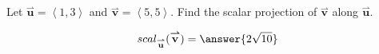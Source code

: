 \documentclass{ximera}
\author{Gregory Hartman \and Matthew Carr \and Bart Snapp}
\begin{document}
\begin{exercise}
Let $\overset{\boldsymbol{\rightharpoonup}}{\mathbf{u}} = \left< 1,3 \right>$ and $\overset{\boldsymbol{\rightharpoonup}}{\mathbf{v}} = \left< 5,5 \right>$. Find the
scalar projection of $\overset{\boldsymbol{\rightharpoonup}}{\mathbf{v}}$ along $\overset{\boldsymbol{\rightharpoonup}}{\mathbf{u}}$.
\begin{prompt}
\[
scal_{\overset{\boldsymbol{\rightharpoonup}}{\mathbf{u}}}(\overset{\boldsymbol{\rightharpoonup}}{\mathbf{v}})=\answer{2\sqrt{10}}
\]
\end{prompt}
\end{exercise}
\end{document}
